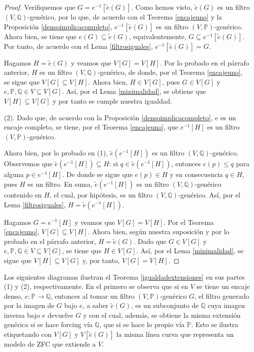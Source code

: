 \documentclass[11pt]{unam_tesis1}
\theoremstyle{MyThmStyle}
\theoremstyle{definition}
\theoremstyle{plain}
\theoremstyle{remark}
\let\leq\leqslant
\begin{document}
\begin{proof}
Verifiquemos que $G=e^{-1}[\tilde e(G)]$. Como hemos visto, $\tilde e(G)$ es un filtro $(V,\mathbb Q)$-gen\'erico, por lo que, de acuerdo con el Teorema \ref{encajeuno} y la Proposici\'on \ref{densoimplicacompleto}, $e^{-1}[\tilde e(G)]$ es un filtro $(V,\mathbb P)$-gen\'erico. Ahora bien, se tiene que $e(G)\subseteq \tilde e(G)$, equivalentemente, $G\subseteq e^{-1}[\tilde e(G)]$. Por tanto, de acuerdo con el Lema \ref{filtrosiguales}, $e^{-1}[\tilde e(G)]= G$.

Hagamos $H=\tilde{e}(G)$ y veamos que $V[G]=V[H]$. Por lo probado en el p\'arrafo anterior, $H$ es un filtro $(V,\mathbb{Q})$-gen\'erico, de donde, por el Teorema \ref{encajeuno}, se sigue que $V[G]\subseteq V[H]$. Ahora bien, $H\in V[G]$, pues $G\in V[G]$ y $e,\mathbb P,\mathbb Q\in V\subseteq V[G]$. As\'i, por el Lema \ref{minimalidad}, se obtiene que $V[H]\subseteq V[G]$ y por tanto se cumple nuestra igualdad.

(2). Dado que, de acuerdo con la Proposici\'on \ref{densoimplicacompleto}, $e$ es un encaje completo, se tiene, por el Teorema \ref{encajeuno}, que $e^{-1}[H]$ es un filtro $(V,\mathbb P)$-gen\'erico.

Ahora bien, por lo probado en (1), $\tilde e(e^{-1}[H])$ es un filtro $(V,\mathbb Q)$-gen\'erico. Observemos que $\tilde e(e^{-1}[H])\subseteq H$: si $q\in \tilde e(e^{-1}[H])$, entonces $e(p)\leq q$ para alguna $p\in e^{-1}[H]$. De donde se sigue que $e(p)\in H$ y en consecuencia $q\in H$, pues $H$ es un filtro. En suma, $\tilde e(e^{-1}[H])$ es un filtro $(V,\mathbb Q)$-gen\'erico contenido en $H$, el cual, por hip\'otesis, es un filtro $(V,\mathbb Q)$-gen\'erico. As\'i, por el Lema \ref{filtrosiguales}, $H=\tilde e(e^{-1}[H])$.

Hagamos $G=e^{-1}[H]$ y veamos que $V[G]=V[H]$. Por el Teorema \ref{encajeuno}, $V[G]\subseteq V[H]$. Ahora bien, seg\'un nuestra suposici\'on y por lo probado en el p\'arrafo anterior, $H=\tilde{e}(G)$. Dado que $G\in V[G]$ y $e,\mathbb P,\mathbb Q\in V\subseteq V[G]$, se tiene que $H\in V[G]$. As\'i, por el Lema \ref{minimalidad}, se sigue que $V[H]\subseteq V[G]$ y, por tanto, $V[G]=V[H]$.
\end{proof}


Los siguientes diagramas ilustran el Teorema \ref{igualdadextensiones} en sus partes (1) y (2), respectivamente. En el primero se observa que si en $V$ se tiene un encaje denso, $e:\mathbb P\to \mathbb Q$, entonces al tomar un filtro $(V,\mathbb P)$-gen\'erico $G$, el filtro generado por la imagen de $G$ bajo $e$, a saber $\tilde e(G)$, es un subconjunto de $\mathbb Q$ cuya imagen inversa bajo $e$ devuelve $G$ y con el cual, adem\'as, se obtiene la misma extensi\'on gen\'erica si se hace forcing v\'ia $\mathbb Q$, que si se hace lo propio v\'ia $\mathbb P$. Esto se ilustra etiquetando con $V[G]$ y $V[\tilde e(G)]$ la misma l\'inea curva que representa un modelo de ZFC que extiende a $V$.
\end{document}

